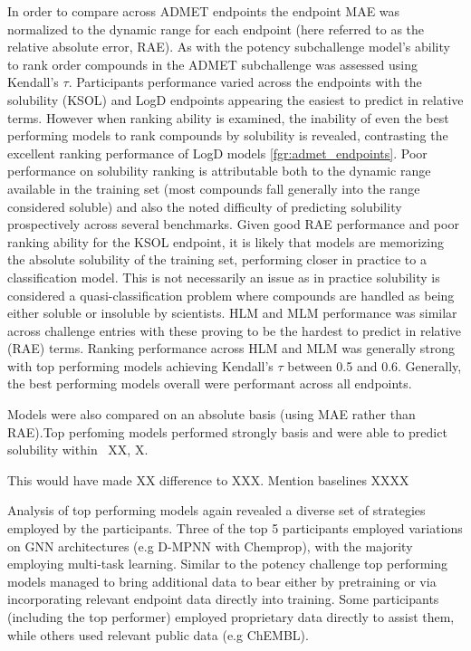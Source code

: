 \documentclass[journal=jcim,manuscript=article]{achemso}
\begin{document}
In order to compare across ADMET endpoints the endpoint MAE was normalized to the dynamic range for each endpoint (here referred to as the relative absolute error, RAE). As with the potency subchallenge model's ability to rank order compounds in the ADMET subchallenge was assessed using Kendall's $\tau$. Participants performance varied across the endpoints with the solubility (KSOL) and LogD endpoints appearing the easiest to predict in relative terms. However when ranking ability is examined, the inability of even the best performing models to rank compounds by solubility is revealed, contrasting the excellent ranking performance of LogD models \ref{fgr:admet_endpoints}.  Poor performance on solubility ranking is attributable both to the dynamic range available in the training set (most compounds fall generally into the range considered soluble) and also the noted difficulty of predicting solubility prospectively across several benchmarks. Given good RAE performance and poor ranking ability for the KSOL endpoint, it is likely that models are memorizing the absolute solubility of the training set, performing closer in practice to a classification model. This is not necessarily an issue as in practice solubility is considered a quasi-classification problem where compounds are handled as being either soluble or insoluble by scientists. HLM and MLM performance was similar across challenge entries with these proving to be the hardest to predict in relative (RAE) terms. Ranking performance across HLM and MLM was generally strong with top performing models achieving Kendall's $\tau$ between 0.5 and 0.6. Generally, the best performing models overall were performant across all endpoints.

Models were also compared on an absolute basis (using MAE rather than RAE).Top perfoming models performed strongly basis and were able to predict solubility within ~XX, X. 

This would have made XX difference to XXX. Mention baselines XXXX


Analysis of top performing models again revealed a diverse set of strategies employed by the participants. Three of the top 5 participants employed variations on GNN architectures (e.g D-MPNN with Chemprop), with the majority employing multi-task learning. Similar to the potency challenge top performing models managed to bring additional data to bear either by pretraining or via incorporating relevant endpoint data directly into training. Some participants (including the top performer) employed proprietary data  directly to assist them, while others used relevant public data (e.g ChEMBL).
\end{document}
